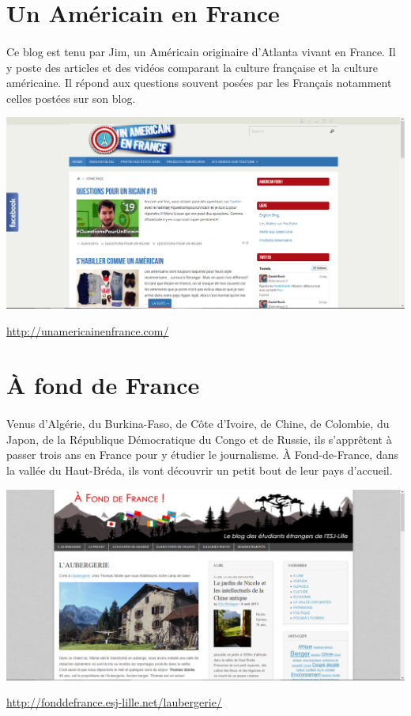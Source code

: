 \section{Un Américain en France}

\paragraph{} Ce blog est tenu par Jim, un Américain originaire d'Atlanta vivant
en France. Il y poste des articles et des vidéos comparant la culture française
et la culture américaine. Il répond aux questions souvent posées par les
Français notamment celles postées sur son blog.

\begin{center}
	\includegraphics[scale=0.25]{Americain.png}
\end{center}
\url{http://unamericainenfrance.com/}

\section{À fond de France}

\paragraph{} Venus d'Algérie, du Burkina-Faso, de Côte d'Ivoire, de Chine, de
Colombie, du Japon, de la République Démocratique du Congo et de Russie, ils
s'apprêtent à passer trois ans en France pour y étudier le journalisme. À
Fond-de-France, dans la vallée du Haut-Bréda, ils vont découvrir un petit bout
de leur pays d'accueil.

\begin{center}
	\includegraphics[scale=0.25]{AFondDeFrance.png}
\end{center}
\url{http://fonddefrance.esj-lille.net/laubergerie/}

